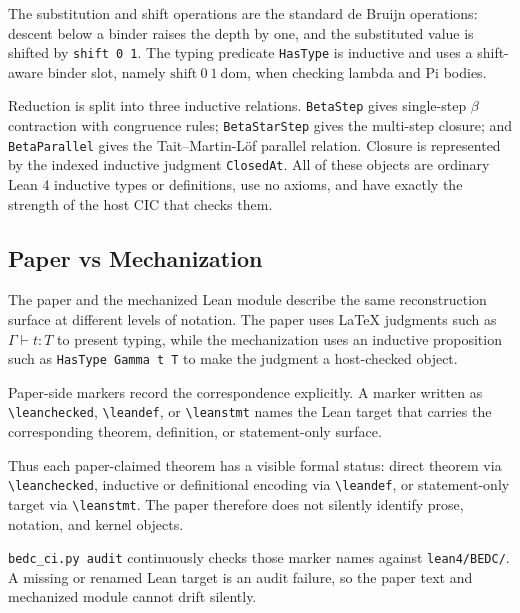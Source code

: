 The substitution and shift operations are the standard de Bruijn operations:
descent below a binder raises the depth by one, and the substituted value is
shifted by \texttt{shift 0 1}. The typing predicate \texttt{HasType} is
inductive and uses a shift-aware binder slot, namely
$\mathrm{shift}\ 0\ 1\ \mathrm{dom}$, when checking lambda and Pi bodies.

Reduction is split into three inductive relations. \texttt{BetaStep} gives
single-step $\beta$ contraction with congruence rules; \texttt{BetaStarStep}
gives the multi-step closure; and \texttt{BetaParallel} gives the
Tait--Martin-L\"of parallel relation. Closure is represented by the indexed
inductive judgment \texttt{ClosedAt}. All of these objects are ordinary Lean 4
inductive types or definitions, use no axioms, and have exactly the strength of
the host CIC that checks them.



\subsection{Paper vs Mechanization}\label{subsec:reconstruction-paper-vs-mechanization}

The paper and the mechanized Lean module describe the same reconstruction
surface at different levels of notation. The paper uses LaTeX judgments such
as $\Gamma \vdash t : T$ to present typing, while the mechanization uses an
inductive proposition such as \texttt{HasType Gamma t T} to make the judgment
a host-checked object.

Paper-side markers record the correspondence explicitly. A marker written as
\texttt{\textbackslash leanchecked}, \texttt{\textbackslash leandef}, or
\texttt{\textbackslash leanstmt} names the Lean target that carries the
corresponding theorem, definition, or statement-only surface.

Thus each paper-claimed theorem has a visible formal status: direct theorem
via \texttt{\textbackslash leanchecked}, inductive or definitional encoding
via \texttt{\textbackslash leandef}, or statement-only target via
\texttt{\textbackslash leanstmt}. The paper therefore does not silently
identify prose, notation, and kernel objects.

\texttt{bedc\_ci.py audit} continuously checks those marker names against
\texttt{lean4/BEDC/}. A missing or renamed Lean target is an audit failure, so
the paper text and mechanized module cannot drift silently.

